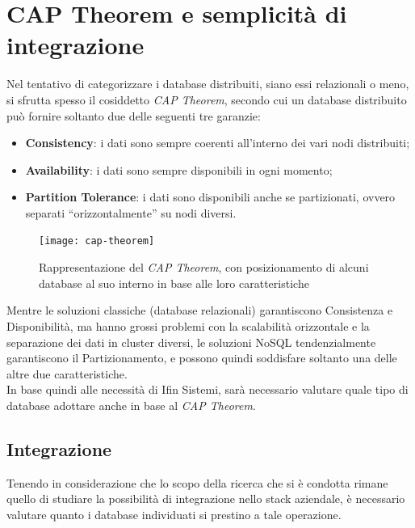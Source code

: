 \section{CAP Theorem e semplicità di integrazione}
\label{sec:cap-theorem-integrazione}

Nel tentativo di categorizzare i database distribuiti, siano essi relazionali o meno, si sfrutta spesso il cosiddetto \textit{CAP Theorem}, secondo cui un database distribuito può fornire soltanto due delle seguenti tre garanzie:
\begin{itemize}
    \item \textbf{Consistency}: i dati sono sempre coerenti all'interno dei vari nodi distribuiti;
    \item \textbf{Availability}: i dati sono sempre disponibili in ogni momento;
    \item \textbf{Partition Tolerance}: i dati sono disponibili anche se partizionati, ovvero separati ``orizzontalmente'' su nodi diversi.
\end{itemize}

\vspace{10pt}
\begin{figure}[htbp]
\begin{center}
\texttt{[image: cap-theorem]}
\caption{Rappresentazione del \textit{CAP Theorem}, con posizionamento di alcuni database al suo interno in base alle loro caratteristiche}
\end{center}
\end{figure}
\vspace{10pt} 

\noindent Mentre le soluzioni classiche (database relazionali) garantiscono Consistenza e Disponibilità, ma hanno grossi problemi con la scalabilità orizzontale e la separazione dei dati in cluster diversi, le soluzioni NoSQL tendenzialmente garantiscono il Partizionamento, e possono quindi soddisfare soltanto una delle altre due caratteristiche.\\

\noindent In base quindi alle necessità di Ifin Sistemi, sarà necessario valutare quale tipo di database adottare anche in base al \textit{CAP Theorem}.

\subsection{Integrazione}
Tenendo in considerazione che lo scopo della ricerca che si è condotta rimane quello di studiare la possibilità di integrazione nello stack aziendale, è necessario valutare quanto i database individuati si prestino a tale operazione.\\

